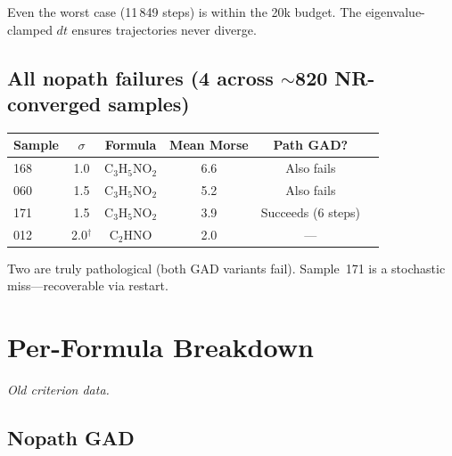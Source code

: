 \documentclass[11pt,a4paper]{article}
\begin{document}
Even the worst case (11\,849 steps) is within the 20k budget.
The eigenvalue-clamped $dt$ ensures trajectories never diverge.

\subsection{All nopath failures (4 across $\sim$820 NR-converged samples)}

\begin{center}\small
\begin{tabular}{lccccl}
\toprule
Sample & $\sigma$ & Formula & Mean Morse & Path GAD? \\
\midrule
168 & 1.0 & C$_3$H$_5$NO$_2$ & 6.6 & Also fails \\
060 & 1.5 & C$_3$H$_5$NO$_2$ & 5.2 & Also fails \\
171 & 1.5 & C$_3$H$_5$NO$_2$ & 3.9 & Succeeds (6 steps) \\
012 & 2.0$^\dagger$ & C$_2$HNO & 2.0 & --- \\
\bottomrule
\end{tabular}
\end{center}

Two are truly pathological (both GAD variants fail).  Sample~171 is a
stochastic miss---recoverable via restart.

\section{Per-Formula Breakdown}
\label{app:performula}

\textit{Old criterion data.}

\subsection{Nopath GAD}
\end{document}

